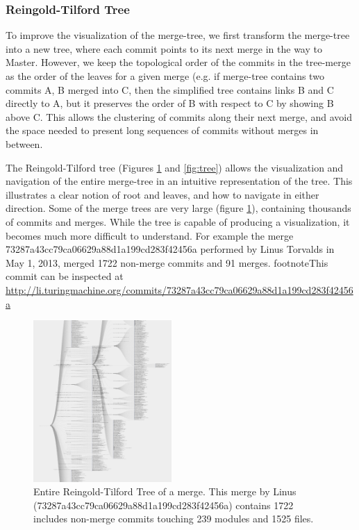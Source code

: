 \documentclass[conference, draftclsnofoot, draft]{IEEEtran}
\begin{document}
\subsubsection{Reingold-Tilford Tree}

To improve the visualization of the merge-tree, we first transform the merge-tree into a new tree, where each commit points to its next merge in the way to Master. However, we keep the topological order of the commits in the tree-merge as the order of the
leaves for a given merge (e.g. if merge-tree contains two commits A, B merged into C, then the simplified tree contains links B and C directly to A, but it
preserves the order of B with respect to C by showing B above C.
This allows the clustering of commits along their next merge, and avoid the space needed to
present long sequences of commits without merges in between.


The Reingold-Tilford tree\cite{Reingold1981} (Figures \ref{fig:zoomed_tree} and \ref{fig:tree}) allows the visualization and navigation
of the entire merge-tree in an intuitive representation of the tree. This illustrates a clear notion of
root and leaves, and how to navigate in either direction. Some of the merge trees are very large (figure \ref{fig:zoomed_tree}), containing
thousands of commits and merges. While the tree is capable of producing a
visualization, it becomes much more difficult to understand. For example the merge 73287a43cc79ca06629a88d1a199cd283f42456a performed by Linus Torvalds in May
1, 2013, merged 1722 non-merge commits and 91 merges. footnote{This commit can be inspected at \url{http://li.turingmachine.org/commits/73287a43cc79ca06629a88d1a199cd283f42456a}}

\begin{figure}
        \centering
        \includegraphics[width=0.47\textwidth]{figures/tree_zoom.png}
        \caption{Entire Reingold-Tilford Tree of a merge. This merge by Linus (73287a43cc79ca06629a88d1a199cd283f42456a) contains 1722 includes non-merge commits
                touching 239 modules and 1525 files.}
        \label{fig:zoomed_tree}
\end{figure}
\end{document}
